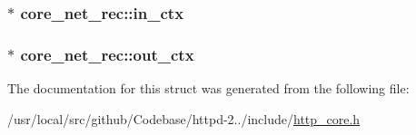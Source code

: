\subsubsection[{\texorpdfstring{in\+\_\+ctx}{in_ctx}}]{$\ast$ core\+\_\+net\+\_\+rec\+::in\+\_\+ctx}\hypertarget{structcore__net__rec_aca7cb16759556547ee789fba7609dd33}{}\label{structcore__net__rec_aca7cb16759556547ee789fba7609dd33}
\subsubsection[{\texorpdfstring{out\+\_\+ctx}{out_ctx}}]{$\ast$ core\+\_\+net\+\_\+rec\+::out\+\_\+ctx}\hypertarget{structcore__net__rec_ae179d22c23e8ff2f19d98a6c00f6c14a}{}\label{structcore__net__rec_ae179d22c23e8ff2f19d98a6c00f6c14a}


The documentation for this struct was generated from the following file\+:\begin{DoxyCompactItemize}
\item 
/usr/local/src/github/\+Codebase/httpd-\/2../include/\hyperlink{http__core_8h}{http\+\_\+core.\+h}\end{DoxyCompactItemize}
